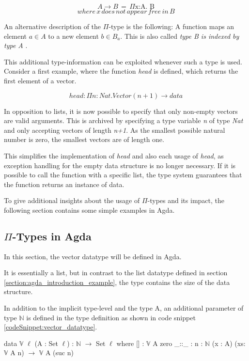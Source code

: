 $$A \rightarrow B \, = \, \Pi \text{x:A. B}$$
$$where \, x \, does \, not \, appear \, free \, in \, B$$

An alternative description of the $\Pi$-type is the following: A function maps an element $a \in A$ to a new element $b \in B_a$. 
This is also called \emph{type B is indexed by type A} \cite{10.1145/2841316}.

This additional type-information can be exploited whenever such a type is used. 
Consider a first example, where the function \emph{head} is defined, which returns the first element of a vector.

$$head : \Pi n : Nat.Vector(n+1) \rightarrow data$$

In opposition to lists, it is now possible to specify that only non-empty vectors are valid arguments. 
This is archived by specifying a type variable \emph{n} of type \emph{Nat} and only accepting vectors of length \emph{n+1}.
As the smallest possible natural number is zero, the smallest vectors are of length one.

This simplifies the implementation of \emph{head} and also each usage of \emph{head}, as exception handling for the empty data structure is no longer necessary. 
If it is possible to call the function with a specific list, the type system guarantees that the function returns an instance of data.

To give additional insights about the usage of $\Pi$-types and its impact, the following section contains some simple examples in Agda.

\subsection{$\Pi$-Types in Agda}\label{section_dependent_types_example}
In this section, the vector datatype will be defined in Agda.

It is essentially a list, but in contrast to the list datatype defined in section \ref{section:agda_introduction_example}, the type contains the size of the data structure.

In addition to the implicit type-level and the type A, an additional parameter of type $\mathbb{N}$ is defined in the type definition as shown in code snippet \ref{codeSnippet:vector_datatype}.

\begin{codesnippet}[mathescape=true, caption={Vector datatype}, label={codeSnippet:vector_datatype}]
data $\mathbb{V}$ {$\ell$} (A : Set $\ell$) : $\mathbb{N}$ $\rightarrow$ Set $\ell$ where
  [] : $\mathbb{V}$ A zero
  _::_ : {n : $\mathbb{N}$} (x : A) (xs: $\mathbb{V}$ A n) $\rightarrow$
         $\mathbb{V}$ A (suc n)
\end{codesnippet}

